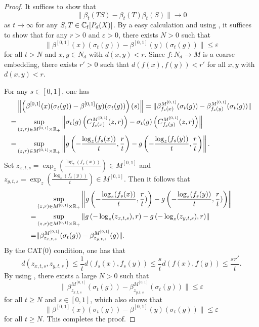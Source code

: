 \documentclass[11pt]{article}
\theoremstyle{definition}
\theoremstyle{plain}
\begin{document}
\begin{proof}
It suffices to show that
$$\|\beta_t(TS)-\beta_t(T)\beta_t(S)\|\to 0$$
as $t\to\infty$ for any $S,T\in\mathbb C_{\rm f}[P_d(X)]$. By a easy calculation and using \cite[Lemma 3.4]{GWY2008}, it suffices to show that for any $r>0$ and $\varepsilon>0$, there exists $N>0$ such that
$$\|\beta^{[0,1]}(x)(\sigma_t(g))-\beta^{[0,1]}(y)(\sigma_t(g))\|\leq \varepsilon$$
for all $t>N$ and $x,y\in N_d$ with $d(x,y)<r$. Since $f: N_d\to M$ is a coarse embedding, there exists $r'>0$ such that $d(f(x),f(y))<r'$ for all $x,y$ with $d(x,y)<r$.

For any $s\in[0,1]$, one has
\[\begin{split}&\left\|\left(\beta^{[0,1]}(x)(\sigma_t(g))-\beta^{[0,1]}(y)(\sigma_t(g))\right)(s)\right\|=\|\beta^{M^{[0,1]}}_{f_s(x)}(\sigma_t(g))-\beta^{M^{[0,1]}}_{f_s(y)}(\sigma_t(g))\|\\
=&\sup_{(z,r)\in M^{[0,1]}\times\mathbb R_+}\left\|\sigma_t(g)\left(C^{M^{[0,1]}}_{f_s(x)}(z,r)\right)-\sigma_t(g)\left(C^{M^{[0,1]}}_{f_s(y)}(z,r)\right)\right\|\\
=&\sup_{(z,r)\in M^{[0,1]}\times\mathbb R_+}\left\|g\left(-\frac{\log_z(f_s(x))}t,\frac rt\right)-g\left(-\frac{\log_z(f_s(y))}t,\frac rt\right)\right\|.
\end{split}\]
Set $z_{x,t,s}=\exp_{z}\left(\frac{\log_z(f_s(x))}t\right)\in M^{[0,1]}$ and $z_{y,t,s}=\exp_{z}\left(\frac{\log_z(f_s(y))}t\right)\in M^{[0,1]}$. Then it follows that
\[\begin{split}&\sup_{(z,r)\in M^{[0,1]}\times\mathbb R_+}\left\|g\left(-\frac{\log_z(f_s(x))}t,\frac rt)\right)-g\left(-\frac{\log_z(f_s(y))}t,\frac rt)\right)\right\|\\
=&\sup_{(z,r)\in M^{[0,1]}\times\mathbb R_+}\left\|g\left(-\log_z(z_{x,t,s}),r\right)-g\left(-\log_z(z_{y,t,s}),r\right)\right\|\\
=&\|\beta^{M^{[0,1]}}_{z_{x,t,s}}(\sigma_t(g))-\beta^{M^{[0,1]}}_{z_{y,t,s}}(g)\|.
\end{split}\]
By the CAT(0) condition, one has that
$$d(z_{x,t,s},z_{y,t,s})\leq \frac 1td(f_s(x),f_s(y))\leq \frac std(f(x),f(y))\leq \frac {sr'}t.$$
By using \cite[Proposition 5.11]{GWY2018}, there exists a large $N>0$ such that 
$$\|\beta^{M^{[0,1]}}_{z_{x,t,s}}(\sigma_t(g))-\beta^{M^{[0,1]}}_{z_{y,t,s}}(\sigma_t(g))\|\leq\varepsilon$$
for all $t\geq N$ and $s\in[0,1]$, which also shows that
$$\|\beta^{[0,1]}(x)(\sigma_t(g))-\beta^{[0,1]}(y)(\sigma_t(g))\|\leq \varepsilon$$
for all $t\geq N$. This completes the proof.
\end{proof}
\end{document}
